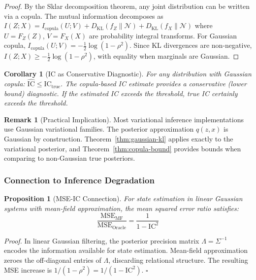 \documentclass[10pt]{article} %
\theoremstyle{plain}
\newtheorem{proposition}[theorem]{Proposition}
\newtheorem{corollary}[theorem]{Corollary}
\theoremstyle{definition}
\newtheorem{remark}[theorem]{Remark}
\newcommand{\IC}{\mathrm{IC}}  %
\begin{document}
\begin{proof}
By the Sklar decomposition theorem, any joint distribution can be written via a copula. The mutual information decomposes as $I(Z; X) = I_{\text{copula}}(U; V) + D_{\text{KL}}(f_Z \| \mathcal{N}) + D_{\text{KL}}(f_X \| \mathcal{N})$ where $U = F_Z(Z)$, $V = F_X(X)$ are probability integral transforms. For Gaussian copula, $I_{\text{copula}}(U; V) = -\frac{1}{2}\log(1-\rho^2)$. Since KL divergences are non-negative, $I(Z; X) \geq -\frac{1}{2}\log(1-\rho^2)$, with equality when marginals are Gaussian.
\end{proof}

\begin{corollary}[IC as Conservative Diagnostic]
For any distribution with Gaussian copula: $\widehat{\IC} \leq \IC_{\text{true}}$. The copula-based IC estimate provides a conservative (lower bound) diagnostic. If the estimated IC exceeds the threshold, true IC certainly exceeds the threshold.
\end{corollary}

\begin{remark}[Practical Implication]
Most variational inference implementations use Gaussian variational families. The posterior approximation $q(z, x)$ is Gaussian by construction. Theorem~\ref{thm:gaussian-kl} applies exactly to the variational posterior, and Theorem~\ref{thm:copula-bound} provides bounds when comparing to non-Gaussian true posteriors.
\end{remark}

\subsubsection{Connection to Inference Degradation}

\begin{proposition}[MSE-IC Connection]
\label{prop:mse-ic}
For state estimation in linear Gaussian systems with mean-field approximation, the mean squared error ratio satisfies:
\begin{equation}
\frac{\text{MSE}_{\text{MF}}}{\text{MSE}_{\text{Oracle}}} = \frac{1}{1 - \IC^2}
\end{equation}
\end{proposition}

\noindent \emph{Proof.} In linear Gaussian filtering, the posterior precision matrix $\Lambda = \Sigma^{-1}$ encodes the information available for state estimation. Mean-field approximation zeroes the off-diagonal entries of $\Lambda$, discarding relational structure. The resulting MSE increase is $1/(1-\rho^2) = 1/(1-\IC^2)$. $\square$
\end{document}
